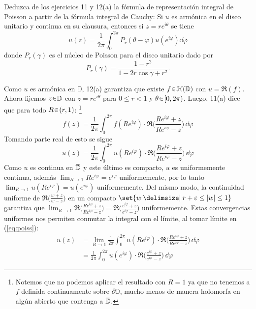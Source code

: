 \setcounter{eje}{11}
\begin{ejer}[b]
Deduzca de los ejercicios 11 y 12(a) la fórmula de representación integral de Poisson a partir de la fórmula integral de Cauchy: Si $u$ es armónica en el disco unitario y continua en su clausura, entonces si $z = re^{i\theta}$ se tiene
\[ u(z) = \frac{1}{2\pi} \int_0^{2\pi} P_r(\theta - \varphi) u(e^{i\varphi}) \dd{\varphi}\]
donde $P_r(\gamma)$ es el núcleo de Poisson para el disco unitario dado por
\[ P_r(\gamma) = \frac{1-r^2}{1-2r\cos\gamma + r^2}. \]
\end{ejer}
\begin{sol}
Como $u$ es armónica en $\mathbb{D}$, 12(a) garantiza que existe $f\en\mathcal{H}(\mathbb{D})$ con $u = \Re(f)$. Ahora fijemos $z\en \mathbb{D}$ con $z=re^{i\theta}$ para $0\le r < 1$ y $\theta\en[0,2\pi)$. Luego, 11(a) dice que para todo $R\en(r,1)$:%
\footnote{
    Notemos que no podemos aplicar el resultado con $R=1$ ya que no tenemos a $f$ definida continuamente sobre $\partial \mathbb{D}$, mucho menos de manera holomorfa en algún abierto que contenga a $\ubar{\mathbb{D}}$.
}
\[
f(z)
= \frac{1}{2\pi} \int^{2\pi}_0 f(Re^{i\varphi}) \cdot \Re\biggl(\frac{Re^{i\varphi} + z}{Re^{i\varphi} - z}\biggr) \,\dd{\varphi}
\]
Tomando parte real de esto se sigue
\begin{equation}\label{eq:poiss}
u(z)
= \frac{1}{2\pi} \int^{2\pi}_0 u(Re^{i\varphi}) \cdot \Re\biggl(\frac{Re^{i\varphi} + z}{Re^{i\varphi} - z}\biggr) \,\dd{\varphi}
\end{equation}
Como $u$ es continua en $\ubar{\mathbb{D}}$ y este último es compacto, $u$ es uniformemente continua, además $\lim_{R\to 1} Re^{i\varphi} = e^{i\varphi}$ uniformemente, por lo tanto $\lim_{R\to 1} u(Re^{i\varphi}) = u(e^{i\varphi})$ uniformemente. Del mismo modo, la continuidad uniforme de $\Re\bigl(\frac{w+z}{w-z}\bigr)$ en un compacto $\set{w \given r+\varepsilon \leq \abs{w} \leq 1}$ garantiza que $\lim_{R\to 1} \Re\bigl(\frac{Re^{i\varphi} + z}{Re^{i\varphi} - z}\bigr) = \Re\bigl(\frac{e^{i\varphi} + z}{e^{i\varphi} - z}\bigr)$ uniformemente. Estas convergencias uniformes nos permiten conmutar la integral con el límite, al tomar límite en (\ref{eq:poiss}):
\begin{align*}
u(z)
&= \lim_{R \to 1}\frac{1}{2\pi} \int^{2\pi}_0 u(Re^{i\varphi}) \cdot \Re\biggl(\frac{Re^{i\varphi} + z}{Re^{i\varphi} - z}\biggr) \,\dd{\varphi}\\
&= \frac{1}{2\pi} \int^{2\pi}_0 u(e^{i\varphi}) \cdot \Re\biggl(\frac{e^{i\varphi} + z}{e^{i\varphi} - z}\biggr) \,\dd{\varphi}

\end{align*}
\end{sol}
